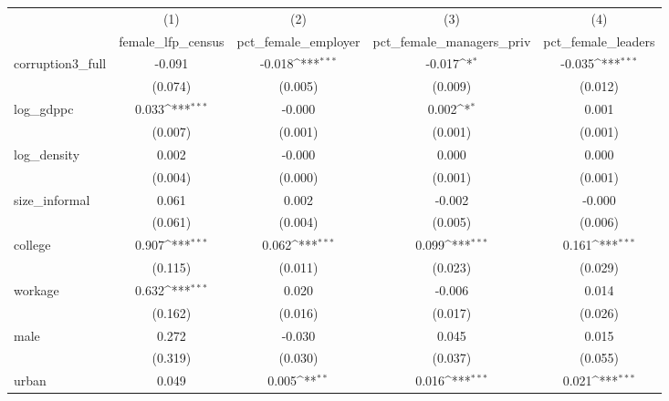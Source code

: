 {
\def\sym#1{\ifmmode^{#1}\else\(^{#1}\)\fi}
\begin{tabular}{l*{4}{c}}
\hline\hline
            &\multicolumn{1}{c}{(1)}&\multicolumn{1}{c}{(2)}&\multicolumn{1}{c}{(3)}&\multicolumn{1}{c}{(4)}\\
            &\multicolumn{1}{c}{female\_lfp\_census}&\multicolumn{1}{c}{pct\_female\_employer}&\multicolumn{1}{c}{pct\_female\_managers\_priv}&\multicolumn{1}{c}{pct\_female\_leaders}\\
\hline
corruption3\_full&      -0.091         &      -0.018\sym{***}&      -0.017\sym{*}  &      -0.035\sym{***}\\
            &     (0.074)         &     (0.005)         &     (0.009)         &     (0.012)         \\
[1em]
log\_gdppc   &       0.033\sym{***}&      -0.000         &       0.002\sym{*}  &       0.001         \\
            &     (0.007)         &     (0.001)         &     (0.001)         &     (0.001)         \\
[1em]
log\_density &       0.002         &      -0.000         &       0.000         &       0.000         \\
            &     (0.004)         &     (0.000)         &     (0.001)         &     (0.001)         \\
[1em]
size\_informal&       0.061         &       0.002         &      -0.002         &      -0.000         \\
            &     (0.061)         &     (0.004)         &     (0.005)         &     (0.006)         \\
[1em]
college     &       0.907\sym{***}&       0.062\sym{***}&       0.099\sym{***}&       0.161\sym{***}\\
            &     (0.115)         &     (0.011)         &     (0.023)         &     (0.029)         \\
[1em]
workage     &       0.632\sym{***}&       0.020         &      -0.006         &       0.014         \\
            &     (0.162)         &     (0.016)         &     (0.017)         &     (0.026)         \\
[1em]
male        &       0.272         &      -0.030         &       0.045         &       0.015         \\
            &     (0.319)         &     (0.030)         &     (0.037)         &     (0.055)         \\
[1em]
urban       &       0.049         &       0.005\sym{**} &       0.016\sym{***}&       0.021\sym{***}\\

\end{tabular}}
